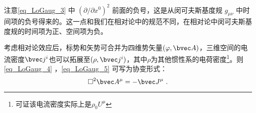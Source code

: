 注意\autoref{eq_LoGaug_3} 中 $(\partial/\partial x^0)^2$ 前面的负号，这是从闵可夫斯基度规 $g_{\mu\nu}$ 中时间项的负号得来的。这一点和我们在相对论中的规范不同，在相对论中闵可夫斯基度规的时间项为正、空间项为负。

考虑相对论效应后，标势和矢势可合并为四维势矢量$(\varphi,\bvec A)$，三维空间的电流密度$\bvec j^i$也可以拓展至$(\rho, \bvec j^i)$，其中$\rho$为其他惯性系的电荷密度\footnote{可证该电流密度实际上是$\rho_0U^{\mu}$}。则\autoref{eq_LoGaug_4} ，\autoref{eq_LoGaug_5} 可写为协变形式：
\begin{equation}
\square^2 \bvec A^{\mu}=-\bvec J^{\mu}~.
\end{equation}






